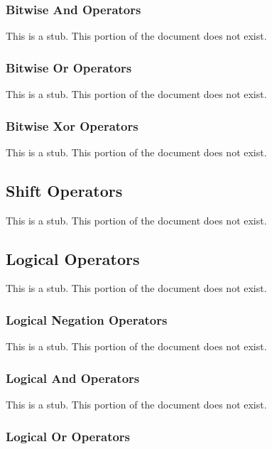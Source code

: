 \subsubsection{Bitwise And Operators}
\label{Bitwise_And_Operators}

This is a stub.  This portion of the document does not exist.

\subsubsection{Bitwise Or Operators}
\label{Bitwise_Or_Operators}

This is a stub.  This portion of the document does not exist.

\subsubsection{Bitwise Xor Operators}
\label{Bitwise_Xor_Operators}

This is a stub.  This portion of the document does not exist.

\subsection{Shift Operators}
\label{Shift_Operators}

This is a stub.  This portion of the document does not exist.

\subsection{Logical Operators}
\label{Logical_Operators}

This is a stub.  This portion of the document does not exist.

\subsubsection{Logical Negation Operators}
\label{Logical_Negation_Operators}

This is a stub.  This portion of the document does not exist.

\subsubsection{Logical And Operators}
\label{Logical_And_Operators}

This is a stub.  This portion of the document does not exist.

\subsubsection{Logical Or Operators}
\label{Logical_Or_Operators}

